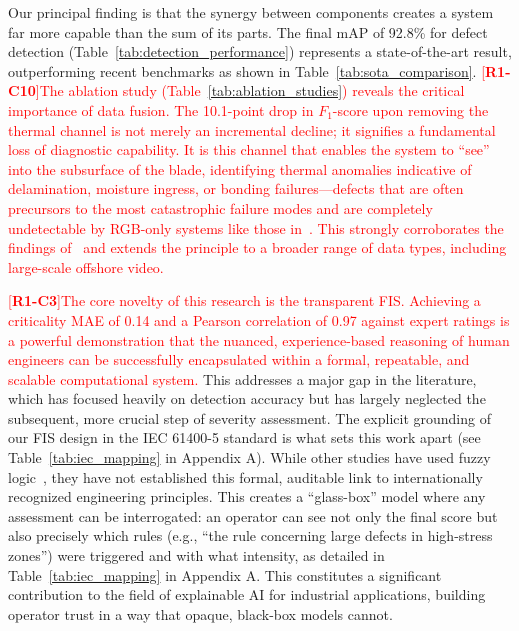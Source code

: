 \documentclass[energies,article,submit,pdftex,moreauthors]{Definitions/mdpi}
\newcommand{\revtag}[2]{[\textbf{R#1-C#2}]}
\newcommand{\Rone}[1]{\textcolor{red}{#1}}
\begin{document}
Our principal finding is that the synergy between components creates a system far more capable than the sum of its parts. The final mAP of 92.8\% for defect detection (Table~\ref{tab:detection_performance}) represents a state-of-the-art result, outperforming recent benchmarks as shown in Table~\ref{tab:sota_comparison}. \Rone{\revtag{1}{10}The ablation study (Table~\ref{tab:ablation_studies}) reveals the critical importance of data fusion. The 10.1-point drop in \(F_{1}\)-score upon removing the thermal channel is not merely an incremental decline; it signifies a fundamental loss of diagnostic capability. It is this channel that enables the system to ``see'' into the subsurface of the blade, identifying thermal anomalies indicative of delamination, moisture ingress, or bonding failures—defects that are often precursors to the most catastrophic failure modes and are completely undetectable by RGB-only systems like those in~\cite{Liu2023Wind, He2024Adaptive}. This strongly corroborates the findings of~\cite{Memari2024Data} and extends the principle to a broader range of data types, including large-scale offshore video.}

\Rone{\revtag{1}{3}The core novelty of this research is the transparent FIS. Achieving a criticality MAE of 0.14 and a Pearson correlation of 0.97 against expert ratings is a powerful demonstration that the nuanced, experience-based reasoning of human engineers can be successfully encapsulated within a formal, repeatable, and scalable computational system.} This addresses a major gap in the literature, which has focused heavily on detection accuracy but has largely neglected the subsequent, more crucial step of severity assessment. The explicit grounding of our FIS design in the IEC 61400-5 standard is what sets this work apart (see Table~\ref{tab:iec_mapping} in Appendix A). While other studies have used fuzzy logic~\cite{Dubchak2024Adaptive}, they have not established this formal, auditable link to internationally recognized engineering principles. This creates a ``glass-box'' model where any assessment can be interrogated: an operator can see not only the final score but also precisely which rules (e.g., ``the rule concerning large defects in high-stress zones'') were triggered and with what intensity, as detailed in Table~\ref{tab:iec_mapping} in Appendix A. This constitutes a significant contribution to the field of explainable AI for industrial applications, building operator trust in a way that opaque, black-box models cannot.
\end{document}
